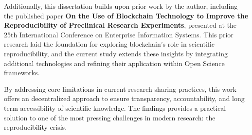 \documentclass{article}
\begin{document}
Additionally, this dissertation builds upon prior work by the author, including the published paper \textbf{On the Use of Blockchain Technology to Improve the Reproducibility of Preclinical Research Experiments}, presented at the 25th International Conference on Enterprise Information Systems. This prior research laid the foundation for exploring blockchain’s role in scientific reproducibility, and the current study extends these insights by integrating additional technologies and refining their application within Open Science frameworks.

By addressing core limitations in current research sharing practices, this work offers an decentralized approach to ensure transparency, accountability, and long term accessibility of scientific knowledge. The findings provides a practical solution to one of the most pressing challenges in modern research: the reproducibility crisis.




\end{document}
